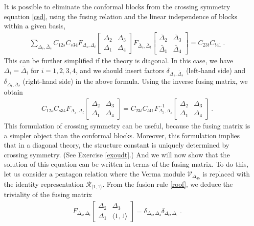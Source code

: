 \documentclass[12pt, a4paper, notitlepage, twoside]{report}
\numberwithin{equation}{section}
\theoremstyle{break}
\begin{document}
It is possible to eliminate the conformal blocks from the crossing symmetry equation \eqref{csd}, using the fusing relation and the linear independence of blocks within a given basis,
\begin{align}
 \sum_{\Delta_s,\bar{\Delta}_s} C_{12s} C_{s34}
F_{\Delta_s,\Delta_t}\begin{bmatrix} \Delta_2 & \Delta_3 \\ \Delta_1 & \Delta_4 \end{bmatrix}
F_{\bar{\Delta}_s,\bar{\Delta}_t}\begin{bmatrix} \bar{\Delta}_2 & \bar{\Delta}_3 \\ \bar{\Delta}_1 & \bar{\Delta}_4 \end{bmatrix}
=  C_{23t}C_{t41}\ .
\end{align}
This can be further simplified if the theory is diagonal.
In this case, we have $\Delta_i=\bar{\Delta}_i$ for $i=1,2,3,4$, and we should insert factors $\delta_{\Delta_s,\bar\Delta_s}$ (left-hand side) and $\delta_{\Delta_t,\bar\Delta_t}$ (right-hand side) in the above formula.
Using the inverse fusing matrix, we obtain 
\begin{align}
 C_{12s} C_{s34}
F_{\Delta_s,\Delta_t}\begin{bmatrix} \Delta_2 & \Delta_3 \\ \Delta_1 & \Delta_4 \end{bmatrix}
= C_{23t}C_{t41} 
F^{-1}_{\Delta_t,\Delta_s}\begin{bmatrix} \Delta_2 & \Delta_3 \\ \Delta_1 & \Delta_4 \end{bmatrix}
\ .
\label{ffm}
\end{align}
This formulation of crossing symmetry can be useful, because the fusing matrix is a simpler object than the conformal blocks. Moreover, this formulation implies that in a diagonal theory, the structure constant is uniquely determined by crossing symmetry. (See Exercise \ref{exoudt}.) 
And we will now show that the solution of this equation can be written in terms of the fusing matrix. 
To do this, let us consider a pentagon relation where the Verma module $\mathcal{V}_{\Delta_{45}}$ is replaced with the identity representation $\mathcal{R}_{\langle 1,1\rangle}$. From the fusion rule \eqref{roof}, we deduce the triviality of the fusing matrix 
\begin{align}
 F_{\Delta_s,\Delta_t}\begin{bmatrix} \Delta_2 & \Delta_3 \\ \Delta_1 & \langle 1,1\rangle \end{bmatrix} = \delta_{\Delta_s,\Delta_3}\delta_{\Delta_t,\Delta_1}\ .
\end{align}
\end{document}
